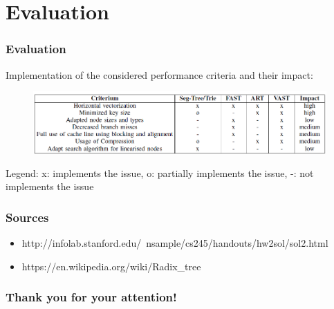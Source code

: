 \documentclass{beamer}
\begin{document}
\section{Evaluation}

\begin{frame}
\frametitle{Evaluation}
Implementation of the considered performance criteria and their impact:
\begin{figure}
	\includegraphics[width=1.05\textwidth]{img/table_eval.png}
\end{figure}
Legend: x: implements the issue, o: partially implements the issue, -: not implements the issue
\end{frame}

\begin{frame}
\frametitle{Sources}
\begin{itemize}
	\item http://infolab.stanford.edu/~nsample/cs245/handouts/hw2sol/sol2.html
	\item https://en.wikipedia.org/wiki/Radix\_tree
\end{itemize}
\end{frame}

\begin{frame}
 \frametitle{Thank you for your attention!}
\end{frame}
\end{document}

